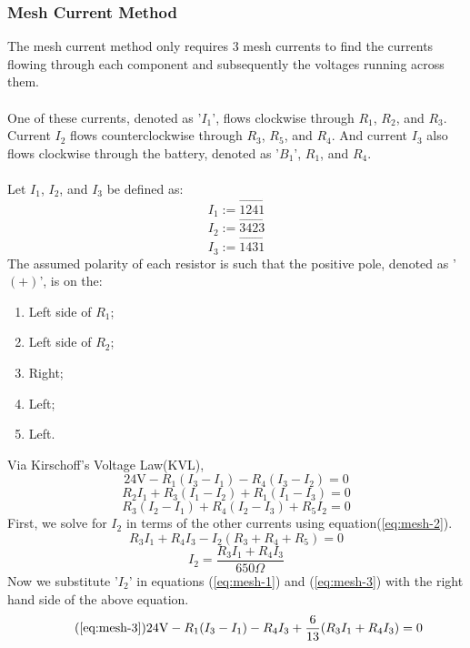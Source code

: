 \documentclass{article}
\begin{document}
	\subsubsection[Mesh]{Mesh Current Method}
	The mesh current method only requires 3 mesh currents to 
	find the 
	currents flowing through each component and subsequently the voltages 
	running across them. \\ \\
	One of these currents, denoted as '$I_1$', flows clockwise through $R_1$, 
	$R_2$, and $R_3$.  Current $I_2$ flows counterclockwise through $R_3$, 
	$R_5$, and 
	$R_4$.  And current $I_3$ also flows clockwise through the battery, denoted 
	as '$B_1$', $R_1$, and $R_4$. \\ \\
	Let $I_1$, $I_2$, and $I_3$ be defined as:
	$$ I_1:=\overrightarrow{1241}$$
	$$ I_2:=\overrightarrow{3423}$$
	$$ I_3:=\overrightarrow{1431}$$
	The assumed polarity of each resistor is such that the positive pole, 
	denoted as '$(+)$', is on the:
	\begin{enumerate}
		\item Left side of $R_1$;
		\item Left side of $R_2$;
		\item Right;
		\item Left;
		\item Left.
	\end{enumerate}
	Via Kirschoff's Voltage Law(KVL),
	\begin{equation}\label{eq:mesh-3}
		24\text{V} - R_1(I_3-I_1) - R_4(I_3-I_2) = 0
	\end{equation}
	\begin{equation}\label{eq:mesh-1}
		R_2I_1 + R_3(I_1-I_2) + R_1(I_1-I_3) = 0
	\end{equation}
	\begin{equation}\label{eq:mesh-2}
		R_3(I_2-I_1) + R_4(I_2-I_3) + R_5I_2 = 0
	\end{equation}
	First, we solve for $I_2$ in terms of the other currents using 
	equation(\ref{eq:mesh-2}).
	$$ R_3I_1+R_4I_3-I_2(R_3 + R_4 + R_5) = 0$$
	\begin{equation}\label{eq:cur_2-in-cur_1-cur_3}
		I_2 = \frac{R_3I_1 + R_4I_3}{650\Omega}
	\end{equation}
	Now we substitute '$I_2$' in equations (\ref{eq:mesh-1}) and 
	(\ref{eq:mesh-3}) with the right hand side of the above equation.
	\begin{equation}\tag{\ref{eq:mesh-3}}
		24\text{V} -R_1(I_3-I_1) - R_4I_3+\frac{6}{13}(R_3I_1 + R_4I_3) = 0
	\end{equation}
\end{document}
